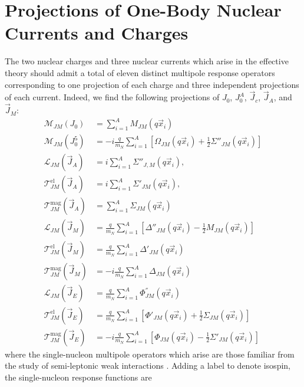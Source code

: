 \documentclass{book}[letterpaper,12pt]
\begin{document}
\section{Projections of One-Body Nuclear Currents and Charges}
\label{sec:single_nucleon_operators}
The two nuclear charges and three nuclear currents which arise in the effective theory should admit a total of eleven distinct multipole response operators corresponding to one projection of each charge and three independent projections of each current. Indeed, we find the following projections of $J_0$, $J_0^A$, $\vec{J}_c$, $\vec{J}_A$, and $\vec{J}_M$:
\begin{equation}
\begin{split}
\mathcal{M}_{JM}(J_0)&=\sum_{i=1}^AM_{JM}(q\vec{x}_i)\\
\mathcal{M}_{JM}(J^5_0)&=-i\frac{q}{m_N}\sum_{i=1}^A \left[\Omega_{JM}(q\vec{x}_i)+\frac{1}{2}\Sigma''_{JM}(q\vec{x}_i)\right]\\
\mathcal{L}_{JM}(\vec{J}_A)&=i\sum_{i=1}^A\Sigma''_{J,M}(q\vec{x}_i),\\
\mathcal{T}^{\mathrm{el}}_{JM}(\vec{J}_A)&=i\sum_{i=1}^A\Sigma'_{JM}(q\vec{x}_i),\\
\mathcal{T}^{\mathrm{mag}}_{JM}(\vec{J}_A)&=\sum_{i=1}^A\Sigma_{JM}(q\vec{x}_i)\\
\mathcal{L}_{JM}(\vec{J}_M)&=\frac{q}{m_N}\sum_{i=1}^A \left[\Delta''_{JM}(q\vec{x}_i)-\frac{1}{2}M_{JM}(q\vec{x}_i)\right]\\
\mathcal{T}^{\mathrm{el}}_{JM}(\vec{J}_M)&=\frac{q}{m_N}\sum_{i=1}^A\Delta'_{JM}(q\vec{x}_i)\\
\mathcal{T}^{\mathrm{mag}}_{JM}(\vec{J}_M)&=-i\frac{q}{m_N}\sum_{i=1}^A\Delta_{JM}(q\vec{x}_i)\\
\mathcal{L}_{JM}(\vec{J}_E)&=\frac{q}{m_N}\sum_{i=1}^A\Phi^{''}_{JM}(q\vec{x}_i)\\
\mathcal{T}^{\mathrm{el}}_{JM}(\vec{J}_E)&=\frac{q}{m_N}\sum_{i=1}^A\left[\Phi'_{JM}(q\vec{x}_i)+\frac{1}{2}\Sigma_{JM}(q\vec{x}_i)\right]\\
\mathcal{T}^{\mathrm{mag}}_{JM}(\vec{J}_E)&=-i\frac{q}{m_N}\sum_{i=1}^A\left[\Phi_{JM}(q\vec{x}_i)-\frac{1}{2}\Sigma'_{JM}(q\vec{x}_i)\right]
\end{split}
\end{equation}
where the single-nucleon multipole operators which arise are those familiar from the study of semi-leptonic weak interactions \cite{DONNELLY1979103,SEROT1979408}. Adding a label to denote isospin, the single-nucleon response functions are
\end{document}
